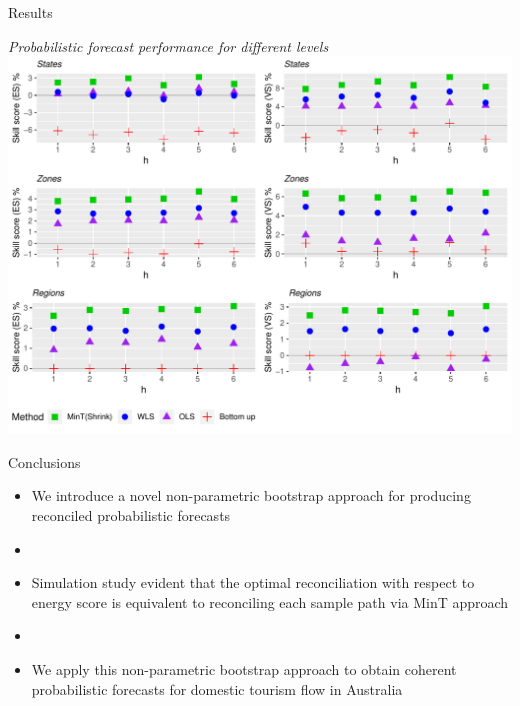 \documentclass[11pt,xcolor=dvipsnames,handout]{beamer}
\begin{document}
\begin{frame}{Results}

\textit{Probabilistic forecast performance for different levels}
\centering
\includegraphics[scale=0.53]{Figures/Results/Stat-Zon-Reg-MultivS}


\end{frame}



\begin{frame}[noframenumbering]{Conclusions}
\begin{itemize}[<+-| alert@+>]
\item We introduce a novel non-parametric bootstrap approach for producing reconciled probabilistic forecasts
\item[]
\item Simulation study evident that the optimal reconciliation with respect to energy score is equivalent to reconciling each sample path via MinT approach
\item[]
\item We apply this non-parametric bootstrap approach to obtain coherent probabilistic forecasts for domestic tourism flow in Australia  




\end{itemize}
\end{frame}
\end{document}
